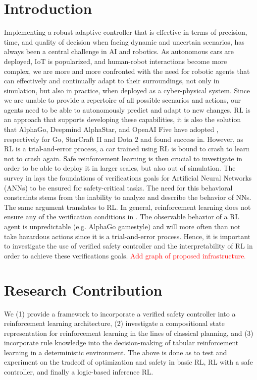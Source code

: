 \documentclass[a4paper,11pt]{article}
\begin{document}
\section{Introduction}
Implementing a robust adaptive controller that is effective in terms of precision, time, and quality of decision
when facing dynamic and uncertain scenarios, has always been a central challenge in AI and robotics.
As autonomous cars are deployed, IoT is popularized, and human-robot interactions become more complex, we
are more and more confronted with the need for robotic agents that can effectively and continually adapt
to their surroundings, not only in simulation, but also in practice, when deployed as a cyber-physical system. 
Since we are unable to provide a repertoire of all possible scenarios and actions,
our agents need to be able to autonomously predict and adapt to new changes. RL is an approach that
supports developing these capabilities, it is also the solution that AlphaGo, Deepmind AlphaStar, and OpenAI Five have
adopted \cite{li2019reinforcement}, respectively for Go, StarCraft II and Dota 2 and found success in. 
However, as RL is a trial-and-error process, a car trained using RL is bound to crash to learn not to crash again. Safe reinforcement learning is then crucial 
to investigate in order to be able to deploy it in larger scales, but also out of simulation. 
The survey in \cite{kurdkelly2003} lays the foundations of verifications goals for Artificial Neural Networks (ANNs) to be ensured for safety-critical tasks. The need for this behavioral constraints stems from the inability to analyze and 
describe the behavior of NNs. The same argument translates to RL. In general, reinforcement learning does not ensure any of the verification conditions in \cite{kurdkelly2003}. 
The observable behavior of a RL agent is unpredictable (e.g. AlphaGo gamestyle) and will more often than not take hazardous actions since it is a trial-and-error process. Hence, it is important to investigate
the use of verified safety controller and the interpretability of RL in order to achieve these verifications goals.  
\textcolor{red}{Add graph of proposed infrastructure.}

\section{Research Contribution}
We (1) provide a framework to incorporate a verified safety controller into a reinforcement learning architecture, 
(2) investigate a compositional state representation for reinforcement learning in the lines of classical planning, 
and (3) incorporate rule knowledge into the decision-making of tabular reinforcement learning in a deterministic environment. 
The above is done as to test and experiment on the tradeoff of optimization and safety in basic RL, RL with a safe controller, 
and finally a logic-based inference RL.
\end{document}
